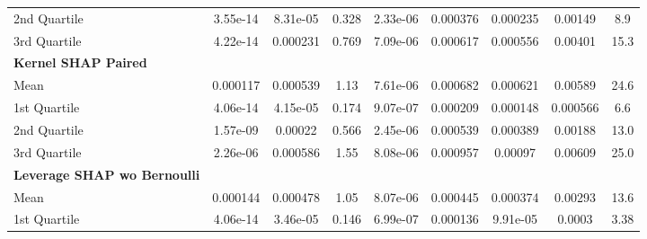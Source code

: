 {\begin{tabular} {lcccccccc}
\hspace{7pt}2nd Quartile & \cellcolor{bronze!60}3.55e-14 & \cellcolor{gold!60}8.31e-05 & \cellcolor{gold!60}0.328 & \cellcolor{gold!60}2.33e-06 & \cellcolor{silver!60}0.000376 & \cellcolor{gold!60}0.000235 & \cellcolor{bronze!60}0.00149 & \cellcolor{silver!60}8.9 \\ 
\hspace{7pt}3rd Quartile & \cellcolor{bronze!60}4.22e-14 & \cellcolor{gold!60}0.000231 & \cellcolor{gold!60}0.769 & \cellcolor{gold!60}7.09e-06 & \cellcolor{gold!60}0.000617 & \cellcolor{gold!60}0.000556 & \cellcolor{silver!60}0.00401 & \cellcolor{silver!60}15.3 \\ 
\addlinespace[1ex] 
\textbf{Kernel SHAP Paired} &  &  &  &  &  &  &  &  \\ 
\hspace{7pt}Mean & 0.000117 & \cellcolor{bronze!60}0.000539 & \cellcolor{bronze!60}1.13 & \cellcolor{silver!60}7.61e-06 & \cellcolor{bronze!60}0.000682 & \cellcolor{bronze!60}0.000621 & 0.00589 & 24.6 \\ 
\hspace{7pt}1st Quartile & 4.06e-14 & \cellcolor{bronze!60}4.15e-05 & \cellcolor{bronze!60}0.174 & \cellcolor{bronze!60}9.07e-07 & 0.000209 & 0.000148 & 0.000566 & 6.6 \\ 
\hspace{7pt}2nd Quartile & 1.57e-09 & \cellcolor{bronze!60}0.00022 & \cellcolor{bronze!60}0.566 & \cellcolor{silver!60}2.45e-06 & 0.000539 & 0.000389 & 0.00188 & 13.0 \\ 
\hspace{7pt}3rd Quartile & 2.26e-06 & \cellcolor{bronze!60}0.000586 & \cellcolor{bronze!60}1.55 & \cellcolor{silver!60}8.08e-06 & 0.000957 & 0.00097 & 0.00609 & \cellcolor{bronze!60}25.0 \\ 
\addlinespace[1ex] 
\textbf{Leverage SHAP wo Bernoulli} &  &  &  &  &  &  &  &  \\ 
\hspace{7pt}Mean & 0.000144 & \cellcolor{silver!60}0.000478 & \cellcolor{silver!60}1.05 & \cellcolor{bronze!60}8.07e-06 & \cellcolor{gold!60}0.000445 & \cellcolor{silver!60}0.000374 & \cellcolor{gold!60}0.00293 & \cellcolor{gold!60}13.6 \\ 
\hspace{7pt}1st Quartile & 4.06e-14 & \cellcolor{silver!60}3.46e-05 & \cellcolor{silver!60}0.146 & \cellcolor{silver!60}6.99e-07 & \cellcolor{silver!60}0.000136 & \cellcolor{bronze!60}9.91e-05 & \cellcolor{gold!60}0.0003 & \cellcolor{gold!60}3.38 \\ 

\end{tabular}}
